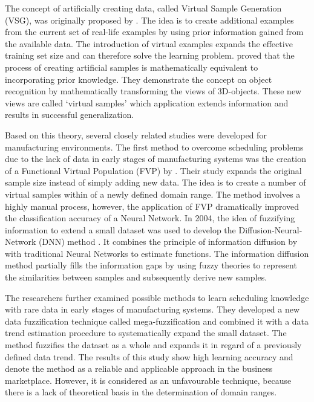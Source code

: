 \documentclass[parskip=full]{scrartcl}
\begin{document}
The concept of artificially creating data, called Virtual Sample Generation (VSG), was originally proposed by \cite{Niyogi.1998}. The idea is to create additional examples from the current set of real-life examples by using prior information gained from the available data. The introduction of virtual examples expands the effective training set size and can therefore solve the learning problem. \cite{Niyogi.1998} proved that the process of creating artificial samples is mathematically equivalent to incorporating prior knowledge. They demonstrate the concept on object recognition by mathematically transforming the views of 3D-objects. These new views are called ‘virtual samples’ which application extends information and results in successful generalization. 

Based on this theory, several closely related studies were developed for manufacturing environments. The first method to overcome scheduling problems due to the lack of data in early stages of manufacturing systems was the creation of a Functional Virtual Population (FVP) by \cite{Li.2003}.  Their study expands the original sample size instead of simply adding new data. The idea is to create a number of virtual samples within of a newly defined domain range. The method involves a highly manual process, however, the application of FVP dramatically improved the classification accuracy of a Neural Network. 
In 2004, the idea of fuzzifying information to extend a small dataset was used to develop the Diffusion-Neural-Network (DNN) method \cite{Huang.2004}. It combines the principle of information diffusion by \cite{Huang.1997} with traditional Neural Networks to estimate functions. The information diffusion method partially fills the information gaps by using fuzzy theories to represent the similarities between samples and subsequently derive new samples. 

The researchers \cite{Li.2006b} further examined possible methods to learn scheduling knowledge with rare data in early stages of manufacturing systems. They developed a new data fuzzification technique called mega-fuzzification and combined it with a data trend estimation procedure to systematically expand the small dataset. The method fuzzifies the dataset as a whole and expands it in regard of a previously defined data trend. The results of this study show high learning accuracy and denote the method as a reliable and applicable approach in the business marketplace. However, it is considered as an unfavourable technique, because there is a lack of theoretical basis in the determination of domain ranges. 
\end{document}
